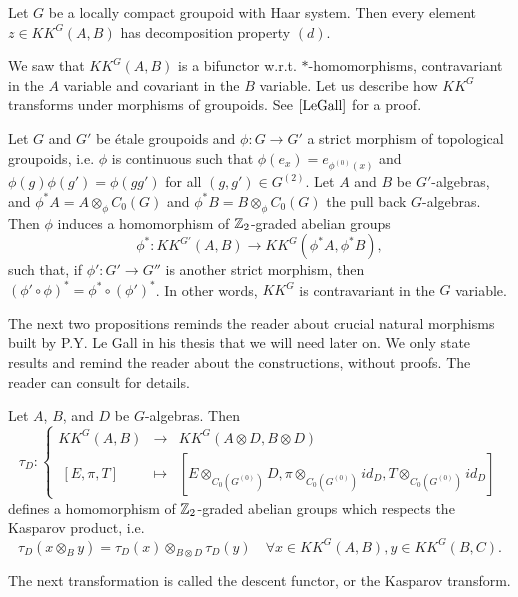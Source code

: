 \begin{thm}\label{propertyD}
Let $G$ be a locally compact groupoid with Haar system. Then every element $z\in KK^G(A,B)$ has decomposition property $(d)$.
\end{thm}

We saw that $KK^G(A,B)$ is a bifunctor w.r.t. $*$-homomorphisms, contravariant in the $A$ variable and covariant in the $B$ variable. Let us describe how $KK^G$ transforms under morphisms of groupoids. See $\cite{LeGall}$ for a proof.

\begin{prop} Let $G$ and $G'$ be étale groupoids and $\phi :G\rightarrow G'$ a strict morphism of topological groupoids, i.e. $\phi$ is continuous such that $\phi(e_x)=e_{\phi^{(0)}(x)}$ and $\phi(g)\phi(g') = \phi(gg')$ for all $(g,g')\in G^{(2)}$. Let $A$ and $B$ be $G'$-algebras, and $\phi^* A = A\otimes_\phi C_0(G)$ and $\phi^* B = B\otimes_\phi C_0(G)$ the pull back $G$-algebras. Then $\phi$ induces a homomorphism of $\mathbb Z_2$-graded abelian groups
\[\phi^* : KK^{G'}(A,B)\rightarrow KK^G(\phi^* A,\phi^* B),\]
such that, if $\phi' : G'\rightarrow G''$ is another strict morphism, then $(\phi'\circ\phi)^* =\phi^*\circ(\phi')^*$. In other words, $KK^G$ is contravariant in the $G$ variable.
\end{prop}

The next two propositions reminds the reader about crucial natural morphisms built by P.Y. Le Gall in his thesis that we will need later on. We only state results and remind the reader about the constructions, without proofs. The reader can consult \cite{LeGall} for details.

\begin{prop}\cite{LeGall} Let $A$, $B$, and $D$ be $G$-algebras. Then 
\[\tau_D : 
\left\{\begin{array}{rcl} 
KK^G(A,B) & \rightarrow & KK^G(A\otimes D,B\otimes D) \\ 
\ [E,\pi,T] & \mapsto     & [E\otimes_{C_0(G^{(0)})} D,\pi\otimes_{C_0(G^{(0)})} id_D,T\otimes_{C_0(G^{(0)})} id_D]
\end{array}\right. \] 
defines a homomorphism of $\mathbb Z_2$-graded abelian groups which respects the Kasparov product, i.e. 
\[\tau_D(x\otimes_B y) = \tau_D(x)\otimes_{B\otimes D} \tau_D(y)\quad \forall x\in KK^G(A,B),y\in KK^G(B,C).\]
\end{prop}

The next transformation is called the descent functor, or the Kasparov transform.

